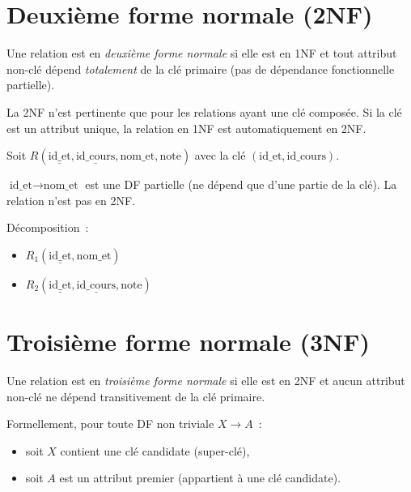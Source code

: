 \section{Deuxi\`eme forme normale (2NF)}

\begin{definition}[2NF]
Une relation est en \emph{deuxi\`eme forme normale} si elle est en 1NF et
tout attribut non-cl\'e d\'epend \emph{totalement} de la cl\'e primaire
(pas de d\'ependance fonctionnelle partielle).
\end{definition}

\begin{remarque}
La 2NF n'est pertinente que pour les relations ayant une cl\'e compos\'ee.
Si la cl\'e est un attribut unique, la relation en 1NF est automatiquement en 2NF.
\end{remarque}

\begin{exemple}
Soit $R(\underline{\text{id\_et}}, \underline{\text{id\_cours}}, \text{nom\_et}, \text{note})$
avec la cl\'e $(\text{id\_et}, \text{id\_cours})$.

$\text{id\_et} \to \text{nom\_et}$ est une DF partielle (ne d\'epend que d'une partie
de la cl\'e). La relation n'est pas en 2NF.

D\'ecomposition~:
\begin{itemize}
    \item $R_1(\underline{\text{id\_et}}, \text{nom\_et})$
    \item $R_2(\underline{\text{id\_et}}, \underline{\text{id\_cours}}, \text{note})$
\end{itemize}
\end{exemple}

\section{Troisi\`eme forme normale (3NF)}

\begin{definition}[3NF]
Une relation est en \emph{troisi\`eme forme normale} si elle est en 2NF et
aucun attribut non-cl\'e ne d\'epend transitivement de la cl\'e primaire.

Formellement, pour toute DF non triviale $X \to A$~:
\begin{itemize}
    \item soit $X$ contient une cl\'e candidate (super-cl\'e),
    \item soit $A$ est un attribut premier (appartient \`a une cl\'e candidate).
\end{itemize}
\end{definition}

